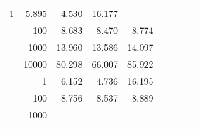 \begin{table}
\begin{tabular}{rrrrrrrrr}
					\multirow{ 1 }{*}{ 1 } &
					
						
							    
							    
	                           5.895 & 4.530 & 16.177  \\
	                
	            
					 &  
					 
					\multirow{ 1 }{*}{ 100 } &
					
						
							    
							    
	                           8.683 & 8.470 & 8.774  \\
	                
	            
					 &  
					 
					\multirow{ 1 }{*}{ 1000 } &
					
						
							    
							    
	                           13.960 & 13.586 & 14.097  \\
	                
	            
					 &  
					 
					\multirow{ 1 }{*}{ 10000 } &
					
						
							    
							    
	                           80.298 & 66.007 & 85.922  \\
	                
	            
	        
				\noalign{\smallskip}\hline
				\multirow{ 4 }{*}{ 160000 } &
				
					
					 
					\multirow{ 1 }{*}{ 1 } &
					
						
							    
							    
	                           6.152 & 4.736 & 16.195  \\
	                
	            
					 &  
					 
					\multirow{ 1 }{*}{ 100 } &
					
						
							    
							    
	                           8.756 & 8.537 & 8.889  \\
	                
	            
					 &  
					 
					\multirow{ 1 }{*}{ 1000 } &
					
						
							    

\end{tabular}
\end{table}
